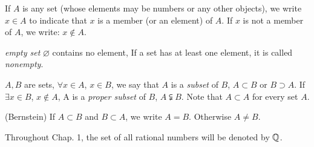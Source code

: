 \begin{mydef}
    \label{mydef:1.3}
    If $A$ is any set (whose elements may be numbers or any other objects), 
    we write $x\in A$ to indicate that $x$ is a member (or an element) of $A$.
    If $x$ is not a member of $A$, we write: $x\notin A$.

    \emph{empty set} $\varnothing$ contains no element, If a set has at least one element, it is called \emph{nonempty}.

    $A,B$ are sets, 
    $\forall x\in A$, $x\in B$, we say that $A$ is a \emph{subset} of $B$, $A \subset B$ or $B \supset A$. 
    If $\exists x\in B$, $x\notin A$, A is a \emph{proper subset} of $B$, $A \subsetneqq B$.
    Note that $A\subset A$ for every set $A$.

    (Bernstein) If $A\subset B$ and $B\subset A$, we write $A = B$. Otherwise $A \neq B$.
\end{mydef}

\begin{mydef}
    \label{mydef:1.4}
    Throughout Chap. 1, the set of all rational numbers will be denoted by ${\protect\mathbb Q} $.
\end{mydef}
